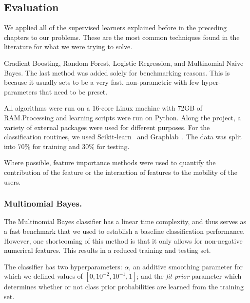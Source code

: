 \subsection{Evaluation}

We applied all of the supervised learners explained before in the preceding chapters to our problems. These are the most common techniques found in the literature for what we were trying to solve.

Gradient Boosting, Random Forest, Logistic Regression, and Multinomial Naive Bayes. The last method was added solely for benchmarking reasons. This is because it usually sets to be a very fast, non-parametric with few hyper-parameters that need to be preset.

All algorithms were run on a 16-core Linux machine with 72GB of RAM.\@ Processing and learning scripts were run on Python. %
Along the project, a variety of external packages were used for different purposes. For the classification routines, we used Scikit-learn~\textcite{scikit-learn} and Graphlab~\textcite{graphlab}.
The data was split into 70\% for training and 30\% for testing.




Where possible, feature importance methods were used to quantify the contribution of the feature or the interaction of features to the mobility of the users.




\subsubsection{Multinomial Bayes.}

The Multinomial Bayes classifier has a linear time complexity, and thus serves as a fast benchmark that we used to establish a baseline classification performance. However, one shortcoming of this method is that it only allows for non-negative numerical features. This results in a reduced training and testing set.

The classifier has two hyperparameters: $\alpha$, an additive smoothing parameter for which we defined values of $[0,{10^{-2}},{10^{-1}},1]$; and the \textit{fit prior} parameter which determines whether or not class prior probabilities are learned from the training set.

